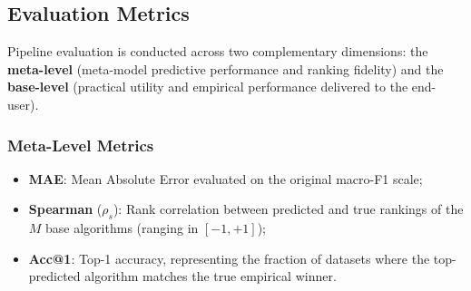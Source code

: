 \documentclass[12pt]{article}
\begin{document}
\subsection{Evaluation Metrics}

Pipeline evaluation is conducted across two complementary dimensions: the \textbf{meta-level} (meta-model predictive performance and ranking fidelity) and the \textbf{base-level} (practical utility and empirical performance delivered to the end-user).

\subsubsection{Meta-Level Metrics}
\begin{itemize}
  \item \textbf{MAE}: Mean Absolute Error evaluated on the original macro-F1 scale;
  \item \textbf{Spearman} ($\rho_s$): Rank correlation between predicted and true rankings of the $M$ base algorithms (ranging in $[-1, +1]$);
  \item \textbf{Acc@1}: Top-1 accuracy, representing the fraction of datasets where the top-predicted algorithm matches the true empirical winner.
\end{itemize}
\end{document}
